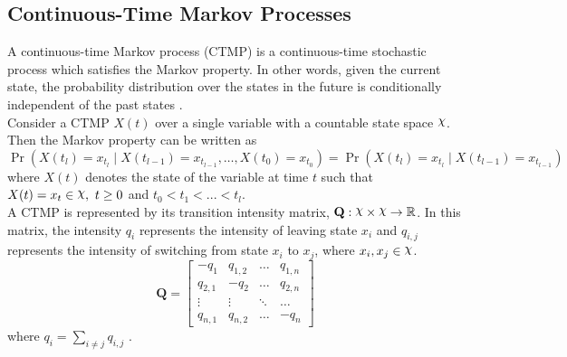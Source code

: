 \subsection{Continuous-Time Markov Processes}
A continuous-time Markov process (CTMP) is a continuous-time stochastic process which satisfies the Markov property. In other words, given the current state, the probability distribution over the states in the future is conditionally independent of the past states \cite{Cohn2010a}. \\
Consider a CTMP $ X(t) $ over a single variable with a countable state space $ \rchi $. Then the Markov property can be written as
\begin{equation}
\operatorname{Pr}\left(X(t_{l})=x_{t_{l}} \mid X(t_{l-1})=x_{t_{l-1}}, \ldots, X(t_{0})=x_{t_{0}}\right)=\operatorname{Pr}\left(X(t_{l})=x_{t_{l}} \mid X(t_{l-1})=x_{t_{l-1}}\right)
\end{equation}
where $ X(t) $ denotes the state of the variable at time $ t $ such that $ X(t)=x_t \in \rchi,\ t \geq 0$ and $ t_0<t_1<...<t_l $.\\
A CTMP is represented by its transition intensity matrix, $ \textbf{Q} : \rchi \times \rchi \rightarrow \mathbb{R}$. In this matrix, the intensity $ q_{i} $ represents the intensity of leaving state $ x_{i} $ and $ q_{i,j} $ represents the intensity of switching from state $ x_{i} $ to $ x_{j} $, where $ x_i, x_j \in \rchi $. 
\begin{equation}
\textbf{Q} = 
\begin{bmatrix}
-q_{1} & q_{1,2} &     {\hdots}  & q_{1,n} \\
q_{2,1} & -q_{2} &     {\hdots}  & q_{2,n}  \\
{\vdots}  &     {\vdots}  &     {\ddots}  & {\hdots}  \\
q_{n,1} &  q_{n,2} &  {\hdots} & -q_{n}
\end{bmatrix}
\label{eq:Q_matrix}
\end{equation}
where $ q_{i} = \sum_{i \neq j} q_{i,j}$ \cite{Nodelman1995}.

